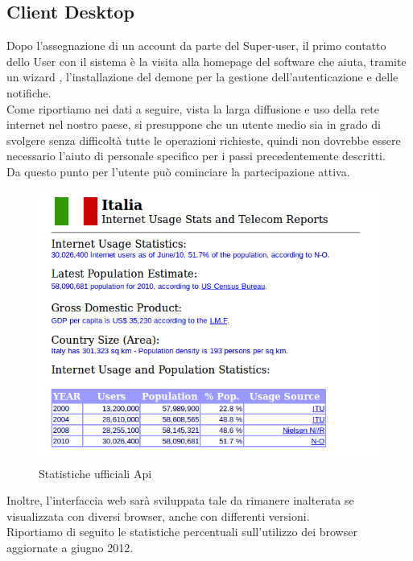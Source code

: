 \documentclass[10pt,a4paper]{article}
\begin{document}
\subsection{Client Desktop}
Dopo l’assegnazione di un account da parte del Super-user, il primo contatto dello User con il sistema è la visita alla homepage del software che aiuta, tramite un wizard , l’installazione del demone per la gestione dell’autenticazione e delle notifiche.\\
Come riportiamo nei dati a seguire, vista la larga diffusione e uso della rete internet nel nostro paese, si presuppone che un utente medio sia in grado di svolgere senza difficoltà tutte le operazioni richieste, quindi non dovrebbe essere necessario l’aiuto di personale specifico per i passi precedentemente descritti.\\
Da questo punto per l’utente può cominciare la partecipazione attiva.\\


\begin{figure}[H]
\centering
\caption{Statistiche ufficiali Api}
\includegraphics[scale=0.55]{images/statItaly} 
\end{figure}

Inoltre, l'interfaccia web sarà sviluppata tale da rimanere inalterata se visualizzata con diversi browser, anche con differenti versioni.\\
Riportiamo di seguito le statistiche percentuali sull'utilizzo dei browser aggiornate a giugno 2012.
\end{document}
